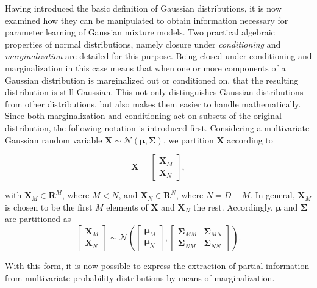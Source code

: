 Having introduced the basic definition of Gaussian distributions, it is now examined how they can be manipulated to obtain information necessary for parameter learning of Gaussian mixture models. Two practical algebraic properties of normal distributions, namely closure under \textit{conditioning} and \textit{marginalization} are detailed for this purpose. Being closed under conditioning and marginalization in this case means that when one or more components of a Gaussian distribution is marginalized out or conditioned on, that the resulting distribution is still Gaussian. This not only distinguishes Gaussian distributions from other distributions, but also makes them easier to handle mathematically. Since both marginalization and conditioning act on subsets of the original distribution, the following notation is introduced first. Considering a multivariate Gaussian random variable $\bm{X} \sim \mathcal{N}(\bm{\mu}, \bm{\Sigma})$, we partition $\bm{X}$ according to 

\begin{equation*}
    \bm{X} = \left[ \begin{array}{c}
        \bm{X}_M \\
        \bm{X}_N
    \end{array} \right],
\end{equation*}

with $\bm{X}_M \in \mathbf{R}^M$, where $M < N$, and $\bm{X}_N \in \mathbf{R}^N$, where $N=D-M$. In general, $\bm{X}_M$ is chosen to be the first $M$ elements of $\bm{X}$ and $\bm{X}_N$ the rest. Accordingly, $\bm{\mu}$ and $\bm{\Sigma}$ are partitioned as
\begin{equation*}
    \left[ \begin{array}{c}
        \bm{X}_M \\
        \bm{X}_N
    \end{array} \right] \sim \mathcal{N} \left( \left[\begin{array}{c}
         \bm{\mu}_M \\
         \bm{\mu}_N
    \end{array}\right], \left[\begin{array}{cc}
        \bm{\Sigma}_{MM} & \bm{\Sigma}_{MN} \\
        \bm{\Sigma}_{NM} & \bm{\Sigma}_{NN}
    \end{array}\right] \right).
\end{equation*}

With this form, it is now possible to express the extraction of partial information from multivariate probability distributions by means of marginalization. 

